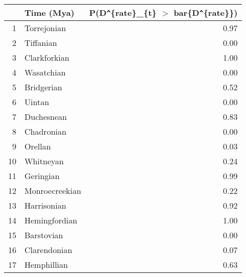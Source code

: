 \begin{table}[ht]
\centering
\begin{tabular}{rlr}
  \hline
 & Time (Mya) & P(D\verb|^|\{rate\}\_\{t\} $>$ bar\{D\verb|^|\{rate\}\}) \\ 
  \hline
1 & Torrejonian & 0.97 \\ 
  2 & Tiffanian & 0.00 \\ 
  3 & Clarkforkian & 1.00 \\ 
  4 & Wasatchian & 0.00 \\ 
  5 & Bridgerian & 0.52 \\ 
  6 & Uintan & 0.00 \\ 
  7 & Duchesnean & 0.83 \\ 
  8 & Chadronian & 0.00 \\ 
  9 & Orellan & 0.03 \\ 
  10 & Whitneyan & 0.24 \\ 
  11 & Geringian & 0.99 \\ 
  12 & Monroecreekian & 0.22 \\ 
  13 & Harrisonian & 0.92 \\ 
  14 & Hemingfordian & 1.00 \\ 
  15 & Barstovian & 0.00 \\ 
  16 & Clarendonian & 0.07 \\ 
  17 & Hemphillian & 0.63 \\ 
   \hline
\end{tabular}
\label{tab:rate_peak}
\end{table}
